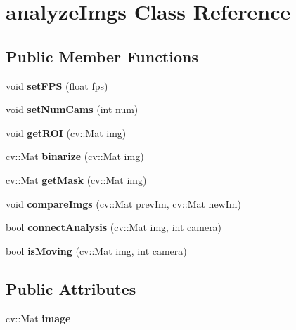 \hypertarget{classanalyze_imgs}{}\section{analyze\+Imgs Class Reference}
\label{classanalyze_imgs}
\subsection*{Public Member Functions}
\begin{DoxyCompactItemize}
\item 
\mbox{\label{classanalyze_imgs_a899a5c6c1c2f6decf3c04a373e786d2f}} 
void {\bfseries set\+F\+PS} (float fps)
\item 
\mbox{\label{classanalyze_imgs_a93840314df4e33629e4454d26b23763c}} 
void {\bfseries set\+Num\+Cams} (int num)
\item 
\mbox{\label{classanalyze_imgs_a624ba3e9d0bd3b8eafe3b805d4259a2b}} 
void {\bfseries get\+R\+OI} (cv\+::\+Mat img)
\item 
\mbox{\label{classanalyze_imgs_a5ca9053a5848b73b448e7cc10fe0247b}} 
cv\+::\+Mat {\bfseries binarize} (cv\+::\+Mat img)
\item 
\mbox{\label{classanalyze_imgs_a7d731a5c365843d72fe5a1f5fffa84d0}} 
cv\+::\+Mat {\bfseries get\+Mask} (cv\+::\+Mat img)
\item 
\mbox{\label{classanalyze_imgs_a79806f36d4bb2ab6beb0142464386e97}} 
void {\bfseries compare\+Imgs} (cv\+::\+Mat prev\+Im, cv\+::\+Mat new\+Im)
\item 
\mbox{\label{classanalyze_imgs_adff6d0fbf91c2c65714a817c23977fc7}} 
bool {\bfseries connect\+Analysis} (cv\+::\+Mat img, int camera)
\item 
\mbox{\label{classanalyze_imgs_a1aa11cadf35335cf8abd7796d25a2dc4}} 
bool {\bfseries is\+Moving} (cv\+::\+Mat img, int camera)
\end{DoxyCompactItemize}
\subsection*{Public Attributes}
\begin{DoxyCompactItemize}
\item 
\mbox{\label{classanalyze_imgs_ac37b6d76c04405d43ba6a6f4e6d902f8}} 
cv\+::\+Mat {\bfseries image}
\end{DoxyCompactItemize}


